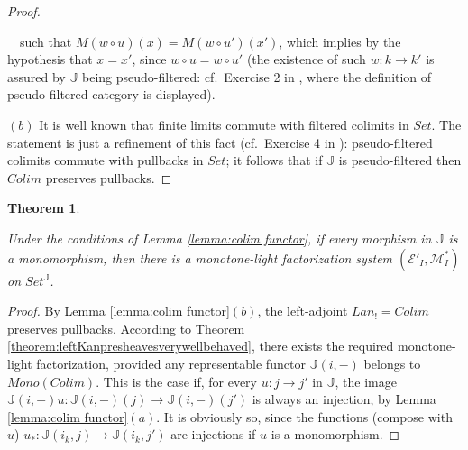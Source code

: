 \documentclass[12pt,a4paper]{amsart}
\newtheorem{theorem}{Theorem}[section]
\theoremstyle{definition}
\begin{document}
\begin{proof}
\begin{picture}
\end{picture}\ \ such that $M(w\circ u)(x)=M(w\circ u')(x')$, which implies by the hypothesis that $x=x'$, since $w\circ u=w\circ u'$ (the existence of such $w:k\rightarrow k'$ is assured by $\mathbb{J}$ being pseudo-filtered: cf.\ Exercise 2 in \cite[\S IX.2]{SM:cat}, where the definition of pseudo-filtered category is displayed).

$(b)$ It is well known that finite limits commute with filtered colimits in $Set$. The statement is just a refinement of this fact (cf.\ Exercise 4 in \cite[\S IX.2]{SM:cat}): pseudo-filtered colimits commute with pullbacks in $Set$; it follows that if $\mathbb{J}$ is pseudo-filtered then $Colim$ preserves pullbacks.\end{proof}

\begin{theorem}\label{theorem:Colimverywellbehaved}

Under the conditions of Lemma \ref{lemma:colim functor}, if every morphism in $\mathbb{J}$ is a monomorphism, then there is a monotone-light factorization system $(\mathcal{E}'_I,\mathcal{M}^*_I)$ on $Set^\mathbb{J}$.

\end{theorem}
\begin{proof}

By Lemma \ref{lemma:colim functor}$(b)$, the left-adjoint $Lan_!=Colim$ preserves pullbacks. According to Theorem \ref{theorem:leftKanpresheavesverywellbehaved}, there exists  the required monotone-light factorization, provided any representable functor $\mathbb{J}(i,-)$ belongs to $Mono(Colim)$. This is the case if, for every $u:j\rightarrow j'$ in $\mathbb{J}$, the image $\mathbb{J}(i,-)u:\mathbb{J}(i,-)(j)\rightarrow \mathbb{J}(i,-)(j')$ is always an injection, by Lemma \ref{lemma:colim functor}$(a)$. It is obviously so, since the functions (compose with $u$) $u_*:\mathbb{J}(i_k,j)\rightarrow\mathbb{J}(i_k,j')$ are injections if $u$ is a monomorphism.\end{proof}
\end{document}
